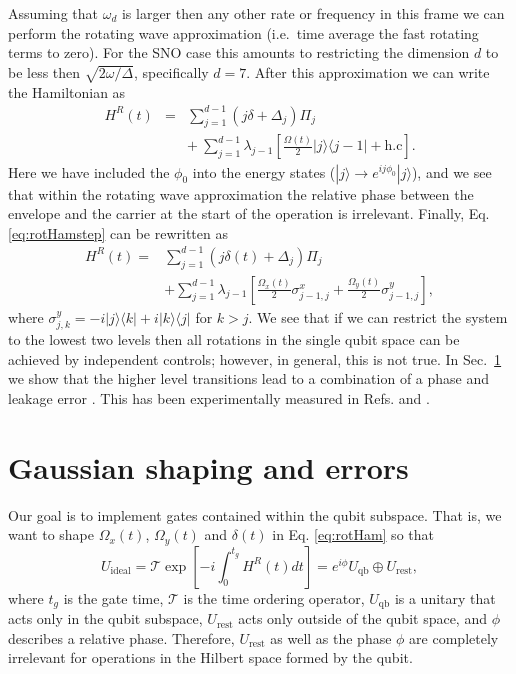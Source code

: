 \documentclass[pra,twocolumn,floatfix,superscriptaddress,eqsecnum]{revtex4-1}
\newcommand{\bra}[1]{\langle{#1}|}
\newcommand{\ket}[1]{|{#1}\rangle}
\begin{document}
Assuming that $\omega_d$ is larger then any other rate or frequency in this frame we can perform the rotating wave approximation (i.e.~time average the fast rotating terms to zero). For the SNO case this amounts to restricting the dimension $d$ to be less then $\sqrt{2\omega/\Delta}$, specifically $d= 7$. After this approximation we can write the Hamiltonian as
\begin{eqnarray}\label{eq:rotHamstep}
H^R(t)&=&\sum_{j=1}^{d-1}(j\delta+\Delta_j)\Pi_j\\
&\ & + \ \sum_{j=1}^{d-1}\lambda_{j-1}\left[\frac{\Omega(t)}{2}\ket{j}\bra{j-1}+\mathrm{h.c}\right].\nonumber
\end{eqnarray} 
Here we have included the $\phi_0$ into the energy states ($\ket{j}\rightarrow e^{ij\phi_0}\ket{j}$), and we see that within the rotating wave approximation the relative phase between the envelope and the carrier at the start of the operation is irrelevant.
Finally, Eq. \eqref{eq:rotHamstep} can be rewritten as
 \begin{equation}\label{eq:rotHam}
\begin{split} H^R(t)=&\sum_{j=1}^{d-1}(j\delta(t)+\Delta_j)\Pi_j \\&+\sum_{j=1}^{d-1}\lambda_{j-1}\left[\frac{\Omega_x(t)}{2}\sigma_{j-1,j}^x +\frac{\Omega_y(t)}{2}\sigma_{j-1,j}^y\right],
\end{split}
\end{equation} where $\sigma_{j,k}^y=-i\ket{j}\bra{k}+i\ket{k}\bra{j}$ for $k>j$.  We see that if we can restrict the system to the lowest two levels then all rotations in the single qubit space can be achieved by independent controls; however, in general, this is not true. In Sec.~\ref{sec:error} we show that the higher level transitions lead to a combination of a phase and leakage error \cite{Steffen2003,Motzoi2009}. This has been experimentally measured in Refs. \cite{Chow2009} and \cite{Lucero2008}. 

\section{Gaussian shaping and errors}\label{sec:error}

Our goal is to implement gates contained within the qubit subspace. That is, we want to shape $\Omega_x(t)$, $\Omega_y(t)$ and $\delta(t)$ in Eq. \eqref{eq:rotHam}  so that
\begin{equation}\label{eq:ideal}
	U_\mathrm{ideal} = \mathcal{T}\exp\left[-i\int_{0}^{t_g}H^R(t)dt\right] = e^{i\phi}U_\mathrm{qb}\oplus U_{\mathrm{rest}},
\end{equation}  where $t_g$ is the gate time, $\mathcal{T}$ is the time ordering operator, $U_\mathrm{qb}$ is a unitary that acts only in the qubit subspace, $U_{\mathrm{rest}}$ acts only outside of the qubit space, and $\phi$ describes a relative phase.  Therefore, $U_{\mathrm{rest}}$ as well as the phase $\phi$ are  completely irrelevant for operations in the Hilbert space formed by the qubit. 
\end{document}
